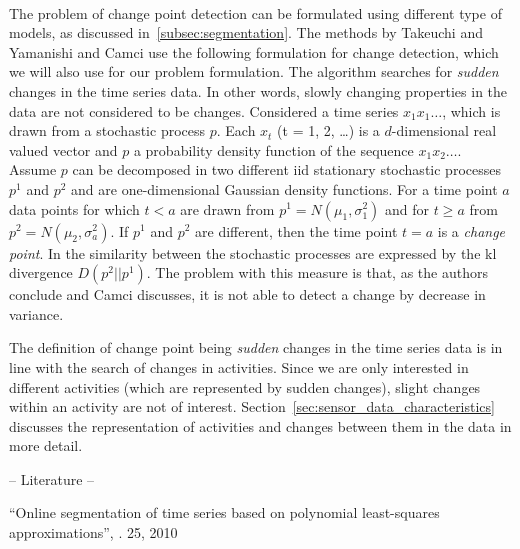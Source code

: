  \\
The problem of change point detection can be formulated using different type of models, as discussed in~\ref{subsec:segmentation}.
The methods by Takeuchi and Yamanishi \cite{takeuchi2006unifying} and Camci \cite{camci2010change} use the following formulation for change detection, which we will also use for our problem formulation.
The algorithm searches for \emph{sudden} changes in the time series data.
In other words, slowly changing properties in the data are not considered to be changes.
Considered a time series $x_1 x_1 \dots$, which is drawn from a stochastic process $p$.
Each $x_t$ (t = 1, 2, \dots) is a $d$-dimensional real valued vector and $p$ a probability density function of the sequence $x_1 x_2 \dots$.
Assume $p$ can be decomposed in two different \gls{iid} stationary stochastic processes $p^1$ and $p^2$ and are one-dimensional Gaussian density functions.
For a time point $a$ data points for which $t < a$ are drawn from $p^1 = N(\mu_1, \sigma_1^2)$ and for $t \geq a$ from $p^2 = N(\mu_2, \sigma_a^2)$.
If $p^1$ and $p^2$ are different, then the time point $t = a$ is a \emph{change point}.
In \cite{takeuchi2006unifying} the similarity between the stochastic processes are expressed by the \gls{kl} divergence $D(p^2||p^1)$.
The problem with this measure is that, as the authors conclude and Camci discusses, it is not able to detect a change by decrease in variance.

The definition of change point being \emph{sudden} changes in the time series data is in line with the search of changes in activities.
Since we are only interested in different activities (which are represented by sudden changes), slight changes within an activity are not of interest.
Section~\ref{sec:sensor_data_characteristics} discusses the representation of activities and changes between them in the data in more detail.


-- Literature --

``Online segmentation of time series based on polynomial least-squares approximations'', \cite{fuchs2010online}. 25, 2010 \\


